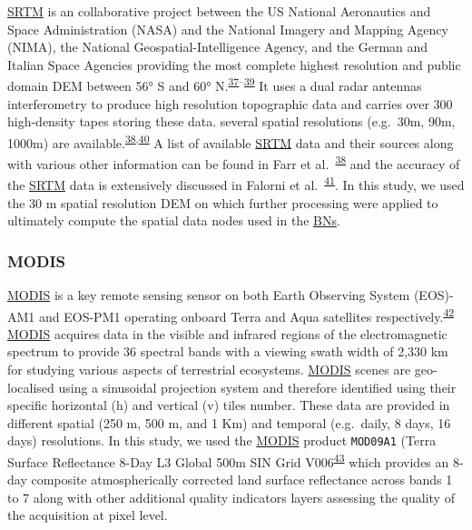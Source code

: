 \documentclass[12pt,oneside]{article}
\begin{document}
\href{https://www2.jpl.nasa.gov/srtm/}{SRTM} is an collaborative project between the US National Aeronautics and Space Administration (NASA) and the National Imagery and Mapping Agency (NIMA), the National Geospatial-Intelligence Agency, and the German and Italian Space Agencies providing the most complete highest resolution and public domain DEM between 56° S and 60° N.\textsuperscript{\protect\hyperlink{ref-Farr_et_al_2000}{37}--\protect\hyperlink{ref-Nikolakopoulos_et_al_2006}{39}} It uses a dual radar antennas interferometry to produce high resolution topographic data and carries over 300 high-density tapes storing these data. several spatial resolutions (e.g.~30m, 90m, 1000m) are available.\textsuperscript{\protect\hyperlink{ref-Farr_et_al_2007}{38},\protect\hyperlink{ref-Jarvis_et_al_2008}{40}} A list of available \href{https://www2.jpl.nasa.gov/srtm/}{SRTM} data and their sources along with various other information can be found in Farr et al.~\textsuperscript{\protect\hyperlink{ref-Farr_et_al_2007}{38}} and the accuracy of the \href{https://www2.jpl.nasa.gov/srtm/}{SRTM} data is extensively discussed in Falorni et al.~\textsuperscript{\protect\hyperlink{ref-Falorni_et_al_2005}{41}}. In this study, we used the 30 m spatial resolution DEM on which further processing were applied to ultimately compute the spatial data nodes used in the \href{https://en.wikipedia.org/wiki/Bayesian_network}{BNs}.

\hypertarget{I22}{%
\subsubsection{MODIS}\label{I22}}

\href{https://terra.nasa.gov/about/terra-instruments/modis}{MODIS} is a key remote sensing sensor on both Earth Observing System (EOS)-AM1 and EOS-PM1 operating onboard Terra and Aqua satellites respectively.\textsuperscript{\protect\hyperlink{ref-King_et_al_1995}{42}} \href{https://terra.nasa.gov/about/terra-instruments/modis}{MODIS} acquires data in the visible and infrared regions of the electromagnetic spectrum to provide 36 spectral bands with a viewing swath width of 2,330 km for studying various aspects of terrestrial ecosystems. \href{https://terra.nasa.gov/about/terra-instruments/modis}{MODIS} scenes are geo-localised using a sinusoidal projection system and therefore identified using their specific horizontal (h) and vertical (v) tiles number. These data are provided in different spatial (250 m, 500 m, and 1 Km) and temporal (e.g.~daily, 8 days, 16 days) resolutions. In this study, we used the \href{https://terra.nasa.gov/about/terra-instruments/modis}{MODIS} product \texttt{MOD09A1} (Terra Surface Reflectance 8-Day L3 Global 500m SIN Grid V006\textsuperscript{\protect\hyperlink{ref-Vermote_2015}{43}} which provides an 8-day composite atmospherically corrected land surface reflectance across bands 1 to 7 along with other additional quality indicators layers assessing the quality of the acquisition at pixel level.
\end{document}

